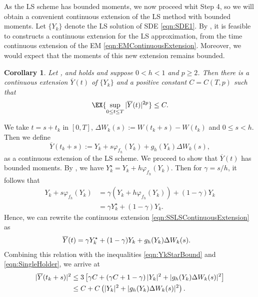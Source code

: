 \documentclass[3p]{elsarticle}
\theoremstyle{definition}
\theoremstyle{plain}%
\newtheorem{corollary}{Corollary}[section]
\theoremstyle{remark}
\newcommand{\SM}{LS\xspace}
\begin{document}
	As the \SM scheme has bounded moments, we now proceed whit Step 4, so we will obtain a convenient 
continuous extension of the \SM method with bounded moments. 
Let $\{Y_k\}$ denote the \SM solution of SDE \eqref{eqn:SDE1}.
By , it is feasible to constructs a continuous extension for the \SM approximation, from the 
time continuous extension of the EM \eqref{eqn:EMContinuousExtension}.
Moreover, we would expect that the moments of this new extension remains bounded.
\begin{corollary}\label{col:ContinuousExtBoundedMoments}
	Let ,   and  holds and suppose  $0<h<1$ and $p\geq 
	2$. Then there is a continuous extension $\overline{Y}(t)$ of $\{Y_k\}$  and a positive constant $C=C(T,p)$ such 
	that
	\begin{equation*}
		\EX{\sup_{0\leq t \leq T} |\overline{Y}(t)|^{2p} }
		\leq C.
	\end{equation*}
\end{corollary}
	\begin{pf}
		We take $t=s+t_k$ in $ [0,T]$, $\Delta W_k(s):= W(t_k+s)- W(t_k)$ and $0\leq s <h$.
		Then we define 
		\begin{equation}\label{eqn:SSLSContinuousExtension}
			\overline{Y}(t_k+s):= Y_k + s \varphi_{f_h}(Y_k) + g_h(Y_k)\Delta W_k(s),
		\end{equation}
		as a continuous extension of the \SM scheme. We proceed to show that $\overline{Y}(t)$ has bounded moments.
		By , we have $Y_k^{\star}= Y_k + h \varphi_{f_h}(Y_k)$. 
		Then for $\gamma = s/h$, it follows that
		\begin{align*}
			Y_k + s \varphi_{f_h}(Y_k)
			&= 
			\gamma (Y_k + h \varphi_{f_h}(Y_k)) +(1-\gamma)Y_k\\
			&=
			\gamma Y_k^{\star} + (1-\gamma)Y_k.
		\end{align*}
		Hence, we can rewrite the continuous extension \eqref{eqn:SSLSContinuousExtension} as
		\begin{align}
			\overline{Y}(t) &=
			\gamma Y^{\star}_k + (1-\gamma) Y_k +g_h(Y_k) \Delta W_k(s). %
			\notag
		\end{align}
		Combining this relation with  the inequalities \eqref{eqn:YkStarBound} and \eqref{eqn:SingleHolder}, we arrive 
		at
		\begin{align}
			|\overline{Y}(t_k+s) |^2 
			&\leq
				3\left[
					\gamma C
					+
					\left(
						\gamma C +1 - \gamma
					\right)
					|Y_k|^2
					+
					|g_h(Y_k)\Delta W_k(s)|^2
			\right] \notag\\
		&\leq
			C
			+
			C
			\left(
				|Y_k|^2 + |g_h(Y_k)\Delta W_k(s)|^2
			\right).
		\notag
		\end{align}
	\end{pf}
\end{document}
